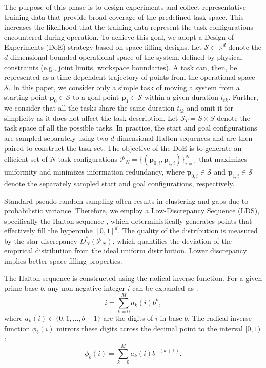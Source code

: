 \documentclass[a4paper,10pt]{cas-sc}%
\newcommand{\rev}[1]{#1}
\newcommand{\roundtworev}[1]{\textcolor{roundtwored}{#1}}
\begin{document}
\rev{
	\roundtworev{The purpose of this phase is to design experiments and collect representative training data that provide broad coverage of the predefined task space. This increases the likelihood that the training data represent the task configurations encountered during operation.} To achieve this goal, we adopt a Design of Experiments (DoE) strategy based on space-filling designs. Let $\mathcal{S} \subset \mathbb{R}^d$ denote the $d$-dimensional bounded operational space of the system, defined by physical constraints (e.g., joint limits, workspace boundaries). A task can, then, be represented as a time-dependent trajectory of points from the operational space $\mathcal{S}.$ In this paper, we consider only a simple task of moving a system from a starting point $\mathbf{p}_0 \in \mathcal{S}$ to a goal point $\mathbf{p}_1 \in \mathcal{S}$ within a given duration $t_{tk}$. Further, we consider that all the tasks share the same duration $t_{tk}$ and omit it for simplicity as it does not affect the task description. Let $\mathcal{S}_T = S\times S$ denote the task space of all the possible tasks. In practice, the start and goal configurations are sampled separately using two $d$-dimensional Halton sequences and are then paired to construct the task set. 
	The objective of the DoE is to generate an efficient set of $N$ task configurations
	$\mathcal{P}_N=\{(\mathbf{p}_{0,i},\mathbf{p}_{1,i})\}_{i=1}^{N}$
	that maximizes uniformity and minimizes information redundancy, where
	$\mathbf{p}_{0,i}\in\mathcal{S}$ and
	$\mathbf{p}_{1,i}\in\mathcal{S}$
	denote the separately sampled start and goal configurations, respectively.
}

Standard pseudo-random sampling often results in clustering and gaps due to probabilistic variance. Therefore, we employ a Low-Discrepancy Sequence (LDS), specifically the Halton sequence \citep{chi2005optimal}, which deterministically generates points that effectively fill the hypercube $[0, 1]^d$. The quality of the distribution is measured by the star discrepancy $D_N^*(\mathcal{P}_N)$, which quantifies the deviation of the empirical distribution from the ideal uniform distribution. Lower discrepancy implies better space-filling properties.

The Halton sequence is constructed using the radical inverse function. For a given prime base $b$, any non-negative integer $i$ can be expanded as \citep{chi2005optimal}:
\begin{equation}
	i = \sum_{k=0}^{M} a_k(i) b^k,
\end{equation}
where $a_k(i) \in \{0, 1, \dots, b-1\}$ are the digits of $i$ in base $b$. The radical inverse function $\phi_b(i)$ mirrors these digits across the decimal point to the interval $[0, 1)$:
\begin{equation}
	\phi_b(i) = \sum_{k=0}^{M} a_k(i) b^{-(k+1)}.
\end{equation}
\end{document}
